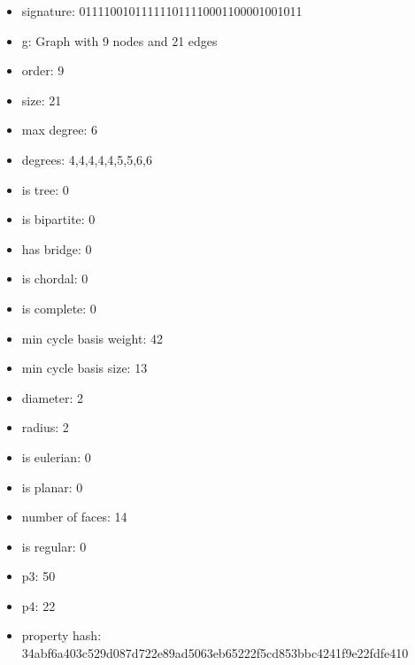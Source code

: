 \newpage
\begin{figure}
\end{figure}
\begin{itemize}
\item signature: 011110010111111011110001100001001011
\item g: Graph with 9 nodes and 21 edges
\item order: 9
\item size: 21
\item max degree: 6
\item degrees: 4,4,4,4,4,5,5,6,6
\item is tree: 0
\item is bipartite: 0
\item has bridge: 0
\item is chordal: 0
\item is complete: 0
\item min cycle basis weight: 42
\item min cycle basis size: 13
\item diameter: 2
\item radius: 2
\item is eulerian: 0
\item is planar: 0
\item number of faces: 14
\item is regular: 0
\item p3: 50
\item p4: 22
\item property hash: 34abf6a403c529d087d722e89ad5063eb65222f5cd853bbc4241f9e22fdfe410
\end{itemize}
